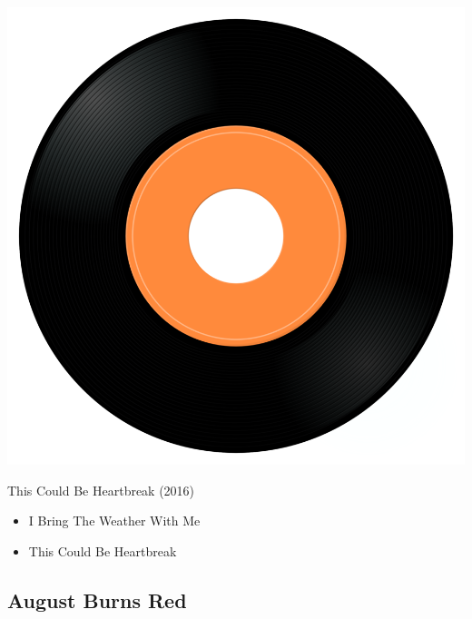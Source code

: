 \begin{minipage}[t]{0.25\textwidth}\vspace{0pt}
\captionsetup{type=figure}
\includegraphics[width=\textwidth]{Images/cover.png}
\caption*{This Could Be Heartbreak (2016)}
\end{minipage}
\begin{minipage}[t]{0.25\textwidth}\vspace{0pt}
\begin{itemize}[nosep,leftmargin=1em,labelwidth=*,align=left]
	\setlength{\itemsep}{0pt}
	\item I Bring The Weather With Me
	\item This Could Be Heartbreak
\end{itemize}
\end{minipage}

\subsection{August Burns Red}

